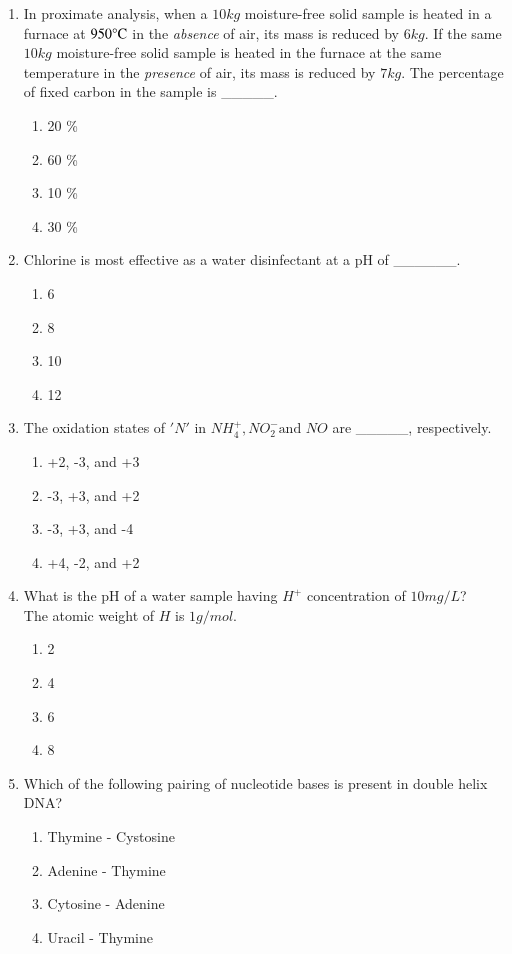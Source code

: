 \documentclass[journal]{IEEEtran}
\begin{document}
\begin{enumerate}[start=1]
\item In proximate analysis, when a $10 kg$ moisture-free solid sample is heated in a furnace at $950\celsius$ in the \textit{absence} of air, its mass is reduced by $6 kg$. If the same $10 kg$ moisture-free solid sample is heated in the furnace at the same temperature in the \textit{presence} of air, its mass is reduced by $7 kg$. The percentage of fixed carbon in the sample is \_\_\_\_\_.
\hfill{}
\begin{enumerate}
    \item 20 \%
    \item 60 \%
    \item 10 \%
    \item 30 \%
\end{enumerate}

\item Chlorine is most effective as a water disinfectant at a pH of \_\_\_\_\_\_.
\hfill{}
\begin{enumerate}
    \item 6
    \item 8
    \item 10
    \item 12
\end{enumerate}

\item The oxidation states of $'N'$ in $NH_4^+, NO_2^- \text{and } NO$ are \_\_\_\_\_, respectively.
\hfill{}
\begin{enumerate}
    \item +2, -3, and +3
    \item -3, +3, and +2
    \item -3, +3, and -4
    \item +4, -2, and +2
\end{enumerate}

\item What is the pH of a water sample having $H^+$ concentration of $10 mg/L$? \\ The atomic weight of $H$ is $1 g/mol$.
\hfill{}
\begin{enumerate}
    \item 2
    \item 4
    \item 6
    \item 8
\end{enumerate}

\item Which of the following pairing of nucleotide bases is present in double helix DNA?
\hfill{}
\begin{enumerate}
    \item Thymine - Cystosine
    \item Adenine - Thymine
    \item Cytosine - Adenine
    \item Uracil - Thymine
\end{enumerate}


\end{enumerate}
\end{document}
